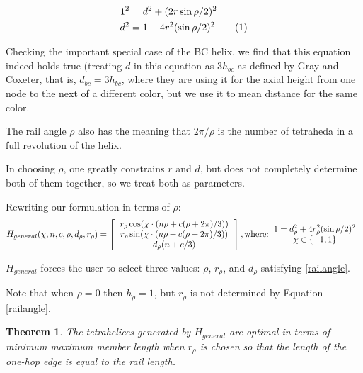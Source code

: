 \documentclass[11pt]{article}
\newtheorem{theorem}{Theorem}
\newcommand\numberthis{\addtocounter{equation}{1}\tag{\theequation}}
\begin{document}
\begin{align*}
  1^2 &= d^2 + (2 r \sin{ \rho / 2})^2 \\
  d^2 &= 1 - 4 r^2 (\sin{ \rho / 2})^2    \numberthis  \label{railangle} \\
\end{align*}

Checking the important special case of the BC helix, we find that this equation
indeed holds true (treating $d$ in this equation as $3 h_{bc}$ as defined by
Gray and Coxeter, that is, $d_{bc} = 3h_{bc}$, where they are using it for the axial height from one node to
the next of a different color, but we use it to mean distance for the same color.

The rail angle $\rho$ also has the meaning that $2 \pi / \rho$ is the number of
tetraheda in a full revolution of the helix.

In choosing $\rho$, one greatly constrains $r$ and $d$, but does not completely
determine both of them together, so we treat both as parameters.

Rewriting our formulation in terms of $\rho$:
\begin{equation}
  \label{eq:general}
H_{general}(\chi,n,c,\rho,d_{\rho},r_{\rho}) =
\left [
  \begin{tabular}{c}
   $ r_{\rho} \cos(\chi \cdot (n \rho + c(\rho +  2 \pi) /3)) $\\
   $ r_{\rho}  \sin(\chi \cdot (n \rho + c(\rho +  2 \pi) /3)) $\\
   $ d_{\rho} (n + c /3) $
  \end{tabular}
  \right ],
\text{where:}
\begin{tabular}{c}
  $   1 = d_{\rho}^2 + 4 r_{\rho}^2 (\sin{ \rho / 2})^2 $ \\
    $\chi \in \{-1,1\}$ \\  
  \end{tabular}      
\end{equation}


$H_{general}$ forces the user to select three values: $\rho$, $r_{\rho}$, and $d_{\rho}$ satisfying \eqref{railangle}.

Note that when $\rho = 0$ then $h_{\rho} = 1$, but $r_{\rho}$ is not determined by
Equation \ref{railangle}.

\begin{theorem}
  \label{generalformulaoptimal}
  The tetrahelices generated by $H_{general}$ are optimal in terms of minimum maximum member length when $r_{\rho}$ is chosen so that
  the length of the one-hop edge is equal to the rail length.
\end{theorem}
\end{document}
